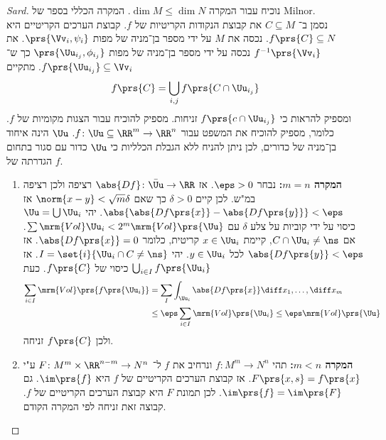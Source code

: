 \documentclass[a4paper,10pt,twoside,openany]{book}
\begin{document}
\begin{proof}[\textenglish{Sard}]
נוכיח עבור המקרה
$\dim M \leq \dim N$.
המקרה הכללי בספר של
\textenglish{Milnor}.\\
נסמן ב־%
$C\subseteq M$
את קבוצת הנקודות הקריטיות של
$f$.
קבוצת הערכים הקריטיים היא
$f\prs{C} \subseteq N$.
נכסה את
$M$
על ידי מספר בן־מניה של מפות
$\prs{\Vv_i, \psi_i}$.
את
$f^{-1}\prs{\Vv_i}$
נכסה על ידי מספר בן־מניה של מפות
$\prs{\Uu_{i_j}, \phi_{i_j}}$
כך ש־%
$f\prs{\Uu_{i_j}} \subseteq \Vv_i$.
מתקיים
\begin{align*}
f\prs{C} = \bigcup_{i,j} f\prs{C \cap \Uu_{i_j}}
\end{align*}
ומספיק להראות כי
$f \prs{c \cap \Uu_{i_j}}$
זניחות.
מספיק להוכיח עבור הצגות מקומיות של
$f$.
כלומר, מספיק להוכיח את המשפט עבור
$f \colon \Uu\subseteq \RR^m \to \RR^n$.
$\Uu$
הינה איחוד בן־מניה של כדורים, לכן ניתן להניח ללא הגבלת הכלליות כי
$\Uu$
כדור עם סגור בתחום הגדרתה של
$f$.
\begin{enumerate}[label = \alph*.]
\item \textbf{המקרה $m=n$:}
נבחר
$\eps > 0$.
אז
$\abs{D f} \colon \bar{\Uu} \to \RR$
רציפה ולכן רציפה במ"ש.
לכן קיים
$\delta > 0$
כך שאם
$\norm{x-y} < \sqrt{m} \delta$
אז
$\abs{\abs{Df\prs{x}} - \abs{Df\prs{y}}} < \eps$.
יהי
$\Uu = \bigcup \Uu_i$
כיסוי על ידי קוביות על צלע
$\delta$
עם
$\sum \mrm{Vol} \Uu_i < 2^m \mrm{Vol}\prs{\Uu}$.
אם
$C \cap \Uu_i \neq \ns$,
קיימת
$x \in \Uu_i$
קריטית, כלומר
$\abs{D f\prs{x}} = 0$.
אז
$\abs{Df\prs{y}} < \eps$
לכל
$y \in \Uu_i$.
יהי
$I = \set{i}{\Uu_i \cap C \neq \ns}$.
אז
$\bigcup_{i\in I} f\prs{\Uu_i}$
כיסוי של
$f\prs{C}$.
כעת
\begin{align*}
\sum_{i\in I} \mrm{Vol}\prs{f\prs{\Uu_i}} &= \sum_{I} \int_{\Uu_i} \abs{Df\prs{x}} \diff x_1,\ldots,\diff x_m \\&\leq
\eps \sum_{i \in I} \mrm{Vol}\prs{\Uu_i} \leq \eps \mrm{Vol}\prs{\Uu}
\end{align*}
ולכן
$f\prs{C}$
זניחה.
\item \textbf{המקרה
$m < n$:}
תהי
$f \colon M^m \to N^n$
ונרחיב את
$f$
ל־%
$F \colon M^m \times \RR^{n-m} \to N^n$
ע"י
$F\prs{x,s} = f\prs{x}$.
אז קבוצת הערכים הקריטיים של
$f$
היא
$\im\prs{f}$.
גם
$\im\prs{f} = \im\prs{F}$.
לכן תמונת
$F$
היא קבוצת הערכים הקריטיים של
$f$.
קבוצה זאת זניחה לפי המקרה הקודם.
\end{enumerate}
\end{proof}
\end{document}
